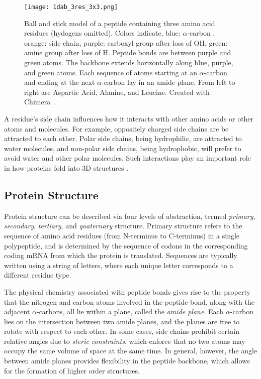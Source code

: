 \begin{figure}
	\centering
	\texttt{[image: 1dab\_3res\_3x3.png]}
	\caption{Ball and stick model of a peptide containing three amino acid residues (hydogens omitted). Colors indicate, blue: $\alpha$-carbon , orange: side chain, purple: carboxyl group after loss of OH, green: amine group after loss of H. Peptide bonds are between purple and green atoms. The backbone extends horizontally along blue, purple, and green atoms. Each sequence of atoms starting at an $\alpha$-carbon and ending at the next $\alpha$-carbon lay in an amide plane. From left to right are Aspartic Acid, Alanine, and Leucine. Created with Chimera~\cite{pettersen2004}.}
	\label{fig:3res}
\end{figure}

A residue's side chain influences how it interacts with other amino acids or other atoms and molecules. 
For example, oppositely charged side chains are be attracted to each other.
Polar side chains, being hydrophilic, are attracted to water molecules, and non-polar side chains, being hydrophobic, will prefer to avoid water and other polar molecules.
Such interactions play an important role in how proteins fold into 3D structures \cite{scheeffink2003}.



\subsection{Protein Structure}

Protein structure can be described via four levels of abstraction, termed \emph{primary}, \emph{secondary}, \emph{tertiary}, and \emph{quaternary} structure.
Primary structure refers to the sequence of amino acid residues (from N-terminus to C-terminus) in a single polypeptide, and is determined by the sequence of codons in the corresponding coding mRNA from which the protein is translated.
Sequences are typically written using a string of letters, where each unique letter corresponds to a different residue type. 

The physical chemistry associated with peptide bonds gives rise to the property that the nitrogen and carbon atoms involved in the peptide bond, along with the adjacent $\alpha$-carbons, all lie within a plane, called the \emph{amide plane}.
Each $\alpha$-carbon lies on the intersection between two amide planes, and the planes are free to rotate with respect to each other. 
In some cases, side chains prohibit certain relative angles due to \emph{steric constraints}, which enforce that no two atoms may occupy the same volume of space at the same time.
In general, however, the angle between amide planes provides flexibility in the peptide backbone, which allows for the formation of higher order structures.

